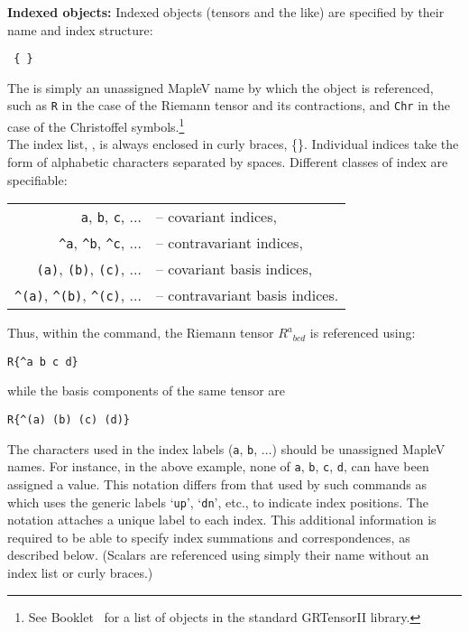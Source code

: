 \documentclass{article}
\begin{document}
\noindent\textbf{Indexed objects:} 
Indexed objects (tensors and the like) are specified by
their name and index structure:
\begin{center}
	\texttt{ \{  \}}
\end{center}
The  is simply an unassigned MapleV name by which the
object is referenced, such as \texttt{R} in the case of the Riemann
tensor and its contractions, and \texttt{Chr} in the case of the
Christoffel symbols.\footnote{See Booklet \grCalcRef~for a list of
objects in the standard GRTensorII library.}\\

The index list, , is always enclosed in curly braces,
\{\}.  Individual indices take the form of alphabetic characters
separated by spaces. Different classes of index are specifiable:
\begin{center}
  \begin{tabular}{rl}
    \texttt{a}, \texttt{b}, \texttt{c}, $\ldots$ & -- covariant indices,\\
    \texttt{\^{}a}, \texttt{\^{}b}, \texttt{\^{}c}, $\ldots$ & -- contravariant
      indices, \\
    \texttt{(a)}, \texttt{(b)}, \texttt{(c)}, $\ldots$ & -- covariant basis
      indices, \\
    \texttt{\^{}(a)}, \texttt{\^{}(b)}, \texttt{\^{}(c)}, $\ldots$ &
      -- contravariant basis indices.
  \end{tabular}
\end{center}
Thus, within the  command, the Riemann tensor $R^a{}_{bcd}$ is
referenced using:
\begin{center}
  \texttt{R\{\^{}a b c d\} }
\end{center}
while the basis components of the same tensor are
\begin{center}
  \texttt{R\{\^{}(a) (b) (c) (d)\} }
\end{center}
The characters used in the index labels (\texttt{a}, \texttt{b},
$\ldots$) should be unassigned MapleV names. For instance, in the
above example, none of \texttt{a}, \texttt{b}, \texttt{c}, \texttt{d},
can have been assigned a value. This notation differs from that used
by such commands as  which uses the generic labels
`\texttt{up}', `\texttt{dn}', etc., to indicate index positions. The
 notation attaches a unique label to each index. This
additional information is required to be able to specify index
summations and correspondences, as described below. (Scalars are
referenced using simply their name without an index list or curly
braces.)\\
\end{document}
